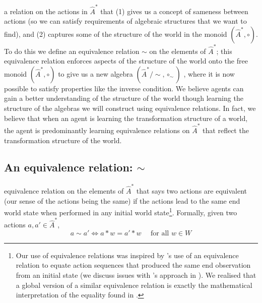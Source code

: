  a relation on the actions in $\hat{A}^{*}$ that (1) gives us a concept of sameness between actions (so we can satisfy requirements of algebraic structures that we want to find), and (2) captures some of the structure of the world in the monoid $(\hat{A}^{*}, \circ)$.
To do this we define an equivalence relation $\sim$ on the elements of $\hat{A}^{\ast}$; this equivalence relation enforces aspects of the structure of the world onto the free monoid $(\hat{A}^{\ast}, \circ)$ to give us a new algebra $(\hat{A}^{\ast}/\sim, \circ_{\sim})$ , where it is now possible to satisfy properties like the inverse condition.
We believe agents can gain a better understanding of the structure of the world though learning the structure of the algebras we will construct using equivalence relations.
In fact, we believe that when an agent is learning the transformation structure of a world, the agent is predominantly learning equivalence relations on $\hat{A}^{*}$ that reflect the transformation structure of the world.


\subsection{An equivalence relation: $\sim$}

 equivalence relation on the elements of $\hat{A}^{\ast}$ that says two actions are equivalent (our sense of the actions being the same) if the actions lead to the same end world state when performed in any initial world state\footnote{
Our use of equivalence relations was inspired by \cite{caselles2020sensory}'s use of an equivalence relation to equate action sequences that produced the same end observation from an initial state (we discuss issues with \cite{caselles2020sensory}'s approach in ).
We realised that a global version of a similar equivalence relation is exactly the mathematical interpretation of the equality found in \cite{Higgins2018}.
}.
Formally, given two actions $a, a' \in \hat{A}^{\ast}$,
\begin{equation}
    a \sim a' \iff a \ast w = a' \ast w \quad \text{ for all $w \in W$}
\end{equation}


